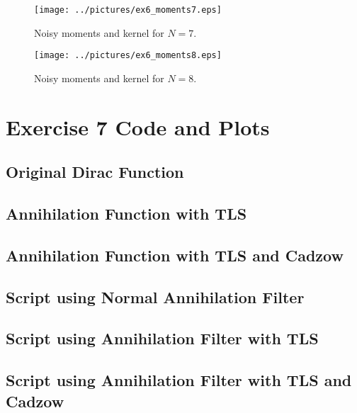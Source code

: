\documentclass[11pt,a4paper]{report}
\begin{document}
\begin{figure}[H]
    \centering
    \texttt{[image: ../pictures/ex6\_moments7.eps]}
    \caption{Noisy moments and kernel for $N = 7$.}
\end{figure}

\begin{figure}[H]
    \centering
    \texttt{[image: ../pictures/ex6\_moments8.eps]}
    \caption{Noisy moments and kernel for $N = 8$.}
\end{figure}

\newpage
\section{Exercise 7 Code and Plots}
\subsection{Original Dirac Function}

\newpage

\subsection{Annihilation Function with TLS}

\newpage

\subsection{Annihilation Function with TLS and Cadzow}

\newpage

\subsection{Script using Normal Annihilation Filter}

\newpage

\subsection{Script using Annihilation Filter with TLS}

\newpage

\subsection{Script using Annihilation Filter with TLS and Cadzow}

\newpage
\end{document}
